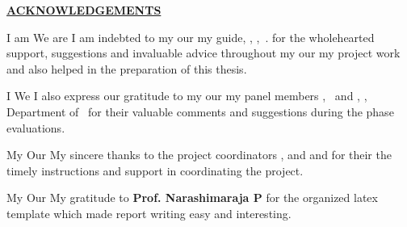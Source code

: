\thispagestyle{empty}

\begin{center}
\Large\textbf{\underline{ACKNOWLEDGEMENTS}} \par
\end{center}

\ifPG I am \else
\ifStuNameBUsed We are \else I am \fi\fi indebted to \ifPG my \else\ifStuNameBUsed our \else my \fi\fi guide, \textbf{\printGuideNameA}, \printGuideDesigA, \printGuideOrgA$\,.$ for the wholehearted support, suggestions and invaluable advice throughout \ifPG my \else\ifStuNameBUsed our \else my \fi\fi project work and also helped in the preparation of this thesis.\\ \par

\ifPG I \else \ifStuNameBUsed We \else I \fi\fi also express our gratitude to \ifPG my \else\ifStuNameBUsed our \else my \fi\fi  panel members \textbf{\printPanelMemberA}, \printPanelMemberDesigA $\,$ and \textbf{\printPanelMemberB}, \printPanelMemberDesigB , Department of \printDepartmentLF\, for their valuable comments and suggestions during the phase evaluations. \\ \par

\ifPG My \else \ifStuNameBUsed Our \else My \fi\fi sincere thanks to the project coordinator\ifProjectMemBUsed s\fi\; \textbf{\printProjectMemberA}\ifProjectMemBUsed \ifProjectMemCUsed,\; \else\; and\; \fi\textbf{\printProjectMemberB} \ifProjectMemCUsed\; and \textbf{\printProjectMemberC} \fi\fi\; for \ifProjectMemBUsed their \else the \fi timely instructions and support in coordinating the project.\\ \par

\ifPG My \else \ifStuNameBUsed Our \else My \fi\fi gratitude to \textbf{Prof. Narashimaraja P} for the organized latex template which made report writing easy and interesting.\\ \par


